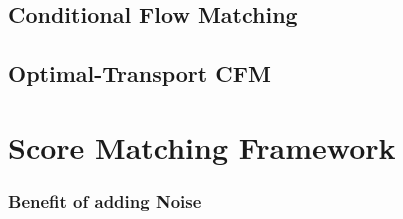 \documentclass[a4paper, 11pt]{article}
\begin{document}
\subsection{Conditional Flow Matching}

\subsection{Optimal-Transport CFM}

\section{Score Matching Framework}

\subsubsection{Benefit of adding Noise}



 

\end{document}
